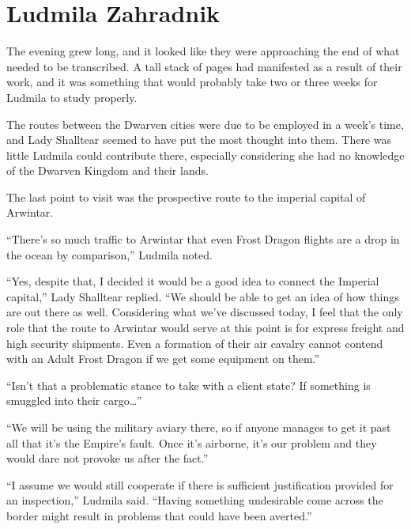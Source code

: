 \chapter{Ludmila Zahradnik}

The evening grew long, and it looked like they were approaching the end of what needed to be transcribed. A tall stack of pages had manifested as a result of their work, and it was something that would probably take two or three weeks for Ludmila to study properly.

 

The routes between the Dwarven cities were due to be employed in a week’s time, and Lady Shalltear seemed to have put the most thought into them. There was little Ludmila could contribute there, especially considering she had no knowledge of the Dwarven Kingdom and their lands.

 

The last point to visit was the prospective route to the imperial capital of Arwintar.

 

“There’s so much traffic to Arwintar that even Frost Dragon flights are a drop in the ocean by comparison,” Ludmila noted.

 

“Yes, despite that, I decided it would be a good idea to connect the Imperial capital,” Lady Shalltear replied. “We should be able to get an idea of how things are out there as well. Considering what we’ve discussed today, I feel that the only role that the route to Arwintar would serve at this point is for express freight and high security shipments. Even a formation of their air cavalry cannot contend with an Adult Frost Dragon if we get some equipment on them.”

 

“Isn’t that a problematic stance to take with a client state? If something is smuggled into their cargo…”

 

“We will be using the military aviary there, so if anyone manages to get it past all that it’s the Empire’s fault. Once it’s airborne, it’s our problem and they would dare not provoke us after the fact.”

 

“I assume we would still cooperate if there is sufficient justification provided for an inspection,” Ludmila said. “Having something undesirable come across the border might result in problems that could have been averted.”

